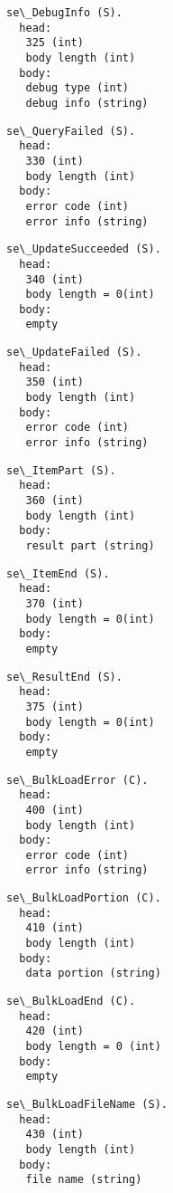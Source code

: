 \documentclass[a4paper,12pt]{article}
\begin{document}
\begin{verbatim}
se\_DebugInfo (S).
  head:
   325 (int)
   body length (int)
  body:
   debug type (int)
   debug info (string)
\end{verbatim}

\begin{verbatim}
se\_QueryFailed (S).
  head:
   330 (int)
   body length (int)
  body:
   error code (int)
   error info (string)
\end{verbatim}

\begin{verbatim}
se\_UpdateSucceeded (S).
  head:
   340 (int)
   body length = 0(int)
  body:
   empty
\end{verbatim}

\begin{verbatim}
se\_UpdateFailed (S).
  head:
   350 (int)
   body length (int)
  body:
   error code (int)
   error info (string)
\end{verbatim}

\begin{verbatim}
se\_ItemPart (S).
  head:
   360 (int)
   body length (int)
  body:
   result part (string)
\end{verbatim}

\begin{verbatim}
se\_ItemEnd (S).
  head:
   370 (int)
   body length = 0(int)
  body:
   empty
\end{verbatim}

\begin{verbatim}
se\_ResultEnd (S).
  head:
   375 (int)
   body length = 0(int)
  body:
   empty
\end{verbatim}

\begin{verbatim}
se\_BulkLoadError (C).
  head:
   400 (int)
   body length (int)
  body:
   error code (int)
   error info (string)
\end{verbatim}

\begin{verbatim}
se\_BulkLoadPortion (C).
  head:
   410 (int)
   body length (int)
  body:
   data portion (string)
\end{verbatim}

\begin{verbatim}
se\_BulkLoadEnd (C).
  head:
   420 (int)
   body length = 0 (int)
  body:
   empty
\end{verbatim}

\begin{verbatim}
se\_BulkLoadFileName (S).
  head:
   430 (int)
   body length (int)
  body:
   file name (string)
\end{verbatim}
\end{document}
